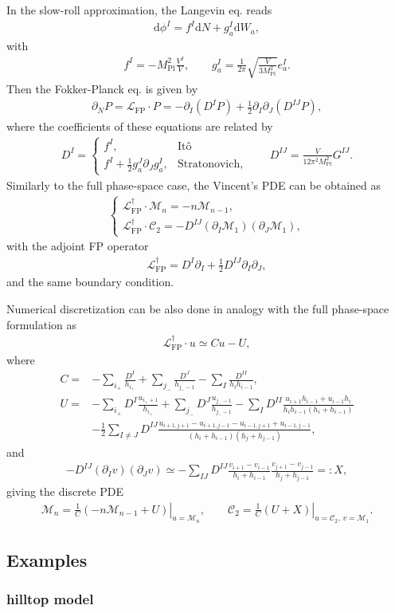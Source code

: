 \documentclass[aps, prd
, preprint
, nofootinbib 
, longbibliography
]{revtex4-1}
\newcommand{\dd}{\mathrm{d}}
\newcommand{\Mpl}{M_\text{Pl}}
\newcommand{\dps}{\displaystyle}
\newcommand{\FP}{\text{FP}}
\newcommand{\calC}{\mathcal{C}}
\newcommand{\calL}{\mathcal{L}}
\newcommand{\calM}{\mathcal{M}}
\newcommand{\bae}[1]{\begin{align} #1 \end{align}}
\newcommand{\bce}[1]{\begin{cases} #1 \end{cases}}
\begin{document}
In the slow-roll approximation, the Langevin eq. reads
\bae{
	\dd\phi^I=f^I\dd N+g^I_a\dd W_a,
}
with
\bae{
	f^I=-\Mpl^2\frac{V^I}{V}, \qquad g^I_a=\frac{1}{2\pi}\sqrt{\frac{V}{3\Mpl^2}}e^I_a.
}
Then the Fokker-Planck eq. is given by
\bae{
    \partial_NP=\calL_\FP\cdot P=-\partial_I(D^IP)+\frac{1}{2}\partial_I\partial_J(D^{IJ}P),
}
where the coefficients of these equations are related by
\bae{
    D^I=\bce{
        \dps
        f^I, & \text{It\^o} \\[10pt]
        \dps
        f^I+\frac{1}{2}g^J_a\partial_Jg^I_a, & \text{Stratonovich},
    }
    \qquad D^{IJ}=\frac{V}{12\pi^2\Mpl^2}G^{IJ}.
}
Similarly to the full phase-space case, the Vincent's PDE can be obtained as
\bae{
    \bce{
        \dps
        \calL_\FP^\dagger\cdot\calM_n=-n\calM_{n-1}, \\[10pt]
        \dps
        \calL_\FP^\dagger\cdot\calC_2=-D^{IJ}(\partial_I\calM_1)(\partial_J\calM_1),
    }
}
with the adjoint FP operator
\bae{
    \calL_\FP^\dagger=D^I\partial_I+\frac{1}{2}D^{IJ}\partial_I\partial_J,
}
and the same boundary condition.

Numerical discretization can be also done in analogy with the full phase-space formulation as
\bae{
    \calL_\FP^\dagger\cdot u\simeq Cu-U,
}
where
\bae{
    C=&-\sum_{i_+}\frac{D^I}{h_{i_+}}
    +\sum_{j_-}\frac{D^J}{h_{j_--1}}
    -\sum_I\frac{D^{II}}{h_ih_{i-1}}, \\
    U=&-\sum_{i_+}D^I\frac{u_{i_++1}}{h_{i_+}}
    +\sum_{j_-}D^J\frac{u_{j_--1}}{h_{j_--1}}
    -\sum_ID^{II}\frac{u_{i+1}h_{i-1}+u_{i-1}h_i}{h_ih_{i-1}(h_i+h_{i-1})} \nonumber \\
    &-\frac{1}{2}\sum_{I\neq J}D^{IJ}\frac{u_{i+1,j+1}-u_{i+1,j-1}-u_{i-1,j+1}+u_{i-1,j-1}}{(h_i+h_{i-1})(h_j+h_{j-1})},
}
and
\bae{
    -D^{IJ}(\partial_Iv)(\partial_Jv)
    \simeq-\sum_{IJ}D^{IJ}\frac{v_{i+1}-v_{i-1}}{h_i+h_{i-1}}
    \frac{v_{j+1}-v_{j-1}}{h_j+h_{j-1}}=:X,
}
giving the discrete PDE
\bae{
    \calM_n=\left.\frac{1}{C}(-n\calM_{n-1}+U)\right|_{u=\calM_n},
    \qquad \calC_2=\left.\frac{1}{C}(U+X)\right|_{u=\calC_2,\,v=\calM_1}.
}



\subsection{Examples}

\subsubsection{hilltop model}
\end{document}
